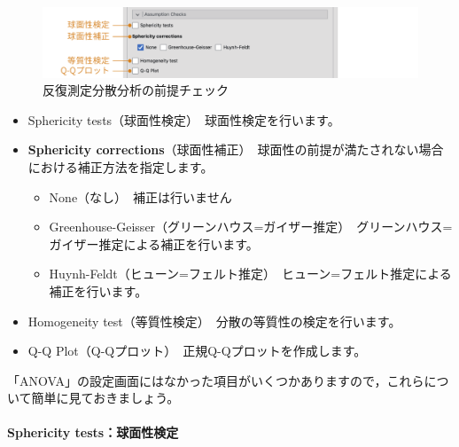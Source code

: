 \documentclass[
  12pt,
  a5jpaper,
  lualatex, ja=standard]{bxjsbook}
\providecommand{\tightlist}{%
  \setlength{\itemsep}{0pt}\setlength{\parskip}{0pt}}
\newenvironment{jmvsettings}{%
	\begin{center}%
	\begin{tcolorbox}[%
		title=設定項目,
		colframe=gmoji,
		colbacktitle=gmoji,
		colback=gmoji!2!white,
		breakable,
		width=.9\textwidth,
		]\small\addtolength{\leftmargini}{-3\labelsep}%
	}%
	{\end{tcolorbox}\end{center}}
\begin{document}
\begin{figure}[!ht]

{\centering \includegraphics[width=1\linewidth]{images/ANOVA/rm-assumptions} 

}

\caption{反復測定分散分析の前提チェック}\label{fig:ANOVA-rm-assumptions}
\end{figure}

\begin{jmvsettings}

\begin{itemize}
\tightlist
\item
  Sphericity tests（球面性検定）　球面性検定を行います。
\item
  \textbf{Sphericity corrections}（球面性補正）　球面性の前提が満たされない場合における補正方法を指定します。

  \begin{itemize}
  \tightlist
  \item
    None（なし）　補正は行いません
  \item
    Greenhouse-Geisser（グリーンハウス=ガイザー推定）　グリーンハウス=ガイザー推定による補正を行います。
  \item
    Huynh-Feldt（ヒューン=フェルト推定）　ヒューン=フェルト推定による補正を行います。
  \end{itemize}
\item
  Homogeneity test（等質性検定）　分散の等質性の検定を行います。
\item
  Q-Q Plot（Q-Qプロット）　正規Q-Qプロットを作成します。
\end{itemize}

\end{jmvsettings}

「ANOVA」の設定画面にはなかった項目がいくつかありますので，これらについて簡単に見ておきましょう。

\hypertarget{sphericity-testsux7403ux9762ux6027ux691cux5b9a}{%
\paragraph*{Sphericity tests：球面性検定}\label{sphericity-testsux7403ux9762ux6027ux691cux5b9a}}
\end{document}
